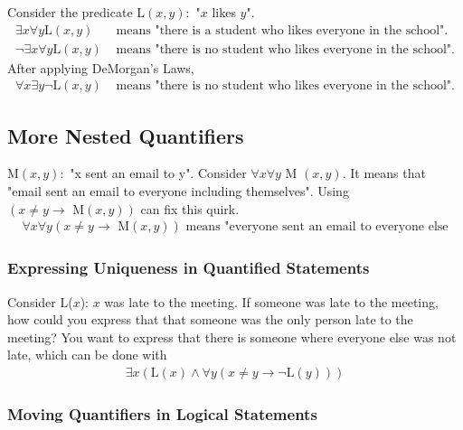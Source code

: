 \documentclass{article}
\begin{document}
\noindent Consider the predicate L\((x,y):\) "\(x\) likes \(y\)".
\begin{align*}
  \exists x \forall y \text{L}(x, y)       & \text{ means "there is a student who likes everyone in the school".}  \\
  \lnot \exists x \forall y \text{L}(x, y) & \text{ means "there is no student who likes everyone in the school".}
\end{align*}
After applying DeMorgan's Laws,
\begin{align*}
  \forall x \exists y \lnot \text{L}(x, y) & \text{ means "there is no student who likes everyone in the school".}
\end{align*}

\subsection{More Nested Quantifiers}

M\((x, y):\) "x sent an email to y". Consider \(\forall x \forall y\) M \((x, y)\).
It means that "email sent an email to everyone including themselves".
Using \(( x \not = y \rightarrow \text{ M}(x, y))\) can fix this quirk.
\begin{align*}
  \forall x \forall y (x \not = y \rightarrow \text{ M}(x, y))
  \text{ means "everyone sent an email to everyone else}
\end{align*}

\subsubsection{Expressing Uniqueness in Quantified Statements}

Consider L($x$): $x$ was late to the meeting. If someone was late to the meeting,
how could you express that that someone was the only person late to the meeting?
You want to express that there is someone where everyone else was not late, which
can be done with
\begin{align*}
  \exists x (\text{L}(x) \land \forall y (x \not = y \rightarrow \lnot \text{L}(y)))
\end{align*}

\subsubsection{Moving Quantifiers in Logical Statements}
\end{document}
